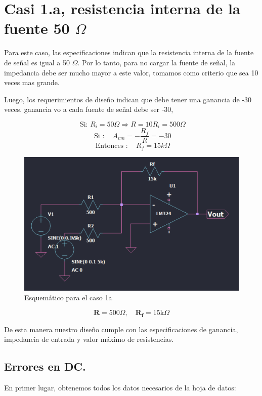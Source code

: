 \section{Casi 1.a, resistencia interna de la fuente 50 $\Omega$}

Para este caso, las especificaciones indican que la resistencia interna de la fuente de señal es igual a 50 $\Omega$. Por lo tanto, para no cargar la fuente de señal, la impedancia debe ser mucho mayor a este valor, tomamos como criterio que sea 10 veces mas grande.

Luego, los requerimientos de diseño indican que debe tener una ganancia de -30 veces. 
ganancia vo a cada fuente de señal debe ser -30, 

\[ \text { Si: } R_{i}=50 \Omega \Longrightarrow R=10 R_{i}=500 \Omega \]
\[ \text { Si }: \quad A_{vm} =-\frac{R_{f}}{R}=-30 \]
\[ \text { Entonces }: \quad R_{f}=15 k \Omega \]
\vspace{1em}



\begin{figure}[h!]
    \centering
    \includegraphics[width=0.90\linewidth]{img/caso1a.png}
    \caption{Esquemático para el caso 1a}
    \label{fig:caso1a}
\end{figure}


\[  \mathbf{R}=500 \Omega, \quad \mathbf{R}_{\mathbf{f}}=15 \mathrm{k} \Omega \]


De esta manera nuestro diseño cumple con las especificaciones de ganancia, impedancia de entrada y valor máximo de resistencias.

\vspace{1em}

\subsection{Errores en DC.}
En primer lugar, obtenemos todos los datos necesarios de la hoja de datos:

